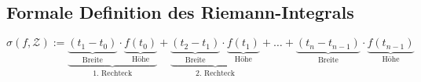 \documentclass[../../main.tex]{subfiles}
\begin{document}
\subsection{Formale Definition des Riemann-Integrals}
\label{riemannintegral-richtig}
\[\sigma(f,\mathcal{Z}):=\underbrace{\underbrace{(t_1-t_0)}_{\text{Breite}}\cdot \underbrace{f(t_0)}_{\text{Höhe}}}_{\text{1. Rechteck}}+\underbrace{\underbrace{(t_2-t_1)}_{\text{Breite}}\cdot \underbrace{f(t_1)}_{\text{Höhe}}}_{\text{2. Rechteck}}+\dots+\underbrace{(t_n-t_{n-1})}_{\text{Breite}}\cdot \underbrace{f(t_{n-1})}_{\text{Höhe}}\]    
\end{document}
